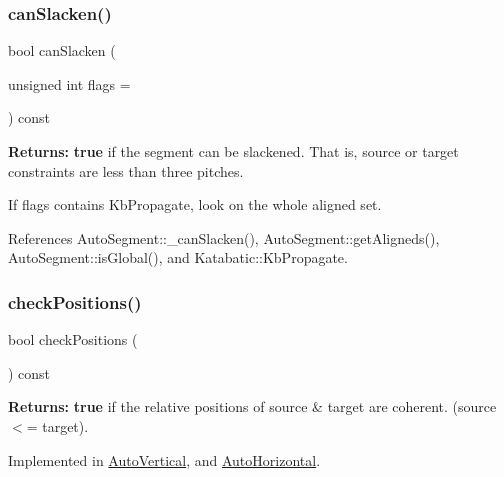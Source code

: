 \subsubsection{\texorpdfstring{can\+Slacken()}{canSlacken()}}
{\footnotesize\ttfamily bool can\+Slacken (\begin{DoxyParamCaption}\item[{unsigned int}]{flags = {} }\end{DoxyParamCaption}) const}

{\bfseries Returns\+:} {\bfseries true} if the segment can be slackened. That is, source or target constraints are less than three pitches.

If {\ttfamily flags} contains Kb\+Propagate, look on the whole aligned set. 

References Auto\+Segment\+::\+\_\+can\+Slacken(), Auto\+Segment\+::get\+Aligneds(), Auto\+Segment\+::is\+Global(), and Katabatic\+::\+Kb\+Propagate.

\mbox{\label{classKatabatic_1_1AutoSegment_af026a81002bd907f1ccd4a4784aaa1db}} 
\subsubsection{\texorpdfstring{check\+Positions()}{checkPositions()}}
{\footnotesize\ttfamily bool check\+Positions (\begin{DoxyParamCaption}{ }\end{DoxyParamCaption}) const\hspace{0.3cm}{\ttfamily [pure virtual]}}

{\bfseries Returns\+:} {\bfseries true} if the relative positions of source \& target are coherent. (source $<$= target). 

Implemented in \mbox{\hyperlink{classKatabatic_1_1AutoVertical_a6575c17bfa589c087215c87678e5719c}{Auto\+Vertical}}, and \mbox{\hyperlink{classKatabatic_1_1AutoHorizontal_a6575c17bfa589c087215c87678e5719c}{Auto\+Horizontal}}.

\mbox{\label{classKatabatic_1_1AutoSegment_a3d5732fd10b4a05076981066a4674487}} 
